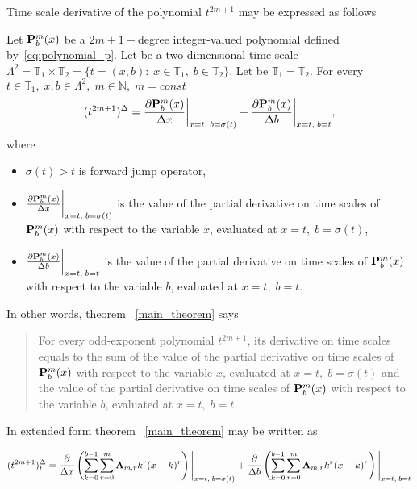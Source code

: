 Time scale derivative of the polynomial $t^{2m+1}$ may be expressed as follows
\begin{thm}
    \label{main_theorem}
    Let ${\mathbf{P}}\sp{m} \sb{b}(x)$ be a $2m+1-$degree integer-valued polynomial defined by~\eqref{eq:polynomial_p}.
    Let be a two-dimensional time scale
    $\Lambda^2 = \mathbb{T}_1 \times \mathbb{T}_2 = \{t=(x, b) \colon \; x\in\mathbb{T}_1, \; b\in\mathbb{T}_2 \}$.
    Let be $\mathbb{T}_1 = \mathbb{T}_2$.
    For every $t\in\mathbb{T}_1, \; x,b\in \Lambda^2, \; m\in\mathbb{N}, \; m = const$
    \[
        (t^{2m+1})^{\Delta} =
        \frac{\partial {\mathbf{P}}\sp{m} \sb{b}(x)}{\Delta x} \bigg |_{x = t, \; b = \sigma(t)}+
        \frac{\partial {\mathbf{P}}\sp{m} \sb{b}(x)}{\Delta b} \bigg |_{x = t, \; b = t},
    \]
    where
    \begin{itemize}
        \setlength\itemsep{1em}
        \item  $\sigma(t) > t$ is forward jump operator,

        \item $\frac{\partial {\mathbf{P}}\sp{m} \sb{b}(x)}{\Delta x} \bigg |_{x = t, \; b = \sigma(t)}$
        is the value of the partial derivative on time scales of
        ${\mathbf{P}}\sp{m} \sb{b}(x)$ with respect to the variable $x$, evaluated at $x = t, \; b = \sigma(t)$,

        \item $\frac{\partial {\mathbf{P}}\sp{m} \sb{b}(x)}{\Delta b} \bigg |_{x = t, \; b = t}$
        is the value of the partial derivative on time scales of
        ${\mathbf{P}}\sp{m} \sb{b}(x)$ with respect to the variable $b$, evaluated at $x = t, \; b = t$.
    \end{itemize}
\end{thm}
In other words, theorem ~\ref{main_theorem} says
\begin{center}
    \begin{quotation}
        For every odd-exponent polynomial $t^{2m+1}$, its derivative on time scales equals to the sum
        of the value of the partial derivative on time scales of
        ${\mathbf{P}}\sp{m} \sb{b}(x)$
        with respect to the variable
        $x$,
        evaluated at
        $x = t, \; b = \sigma(t)$
        and the value of the partial derivative on time scales of
        ${\mathbf{P}}\sp{m} \sb{b}(x)$
        with respect to the variable
        $b$,
        evaluated at
        $x = t, \; b = t$.
    \end{quotation}
\end{center}

In extended form theorem ~\ref{main_theorem} may be written as

\begin{align*}
(t^{2m+1})
    ^{\Delta}_{t} =
    \frac{\partial}{\Delta x} \left( \sum_{k=0}^{b-1} \sum_{r=0}^{m} {\mathbf{A}} \sb{m,r} k^r(x-k)^r \right) \Bigg |_{x = t, \; b = \sigma(t)}
    + \frac{\partial}{\Delta b} \left( \sum_{k=0}^{b-1} \sum_{r=0}^{m} {\mathbf{A}} \sb{m,r} k^r(x-k)^r \right) \Bigg |_{x = t, \; b = t}
\end{align*}